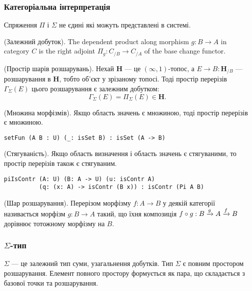 \subsubsection*{Категоріальна інтерпретація}
Спряження $\Pi$ і $\Sigma$ не єдині які можуть представлені в системі.

\begin{definition} (Залежний добуток).
The dependent product along morphism $g: B \rightarrow A$ in category $C$ is the right
adjoint $\Pi_g : C_{/B} \rightarrow C_{/A}$ of the base change functor.
\end{definition}

\begin{definition} (Простір шарів розшарувань).
Нехай $\mathbf{H}$ --- це $(\infty,1)$-топос, а $E \rightarrow B : \mathbf{H}_{/B}$ ---  розшарування в
$\mathbf{H}$, тобто об'єкт у зрізаному топосі.  Тоді простір перерізів $\Gamma_\Sigma(E)$
цього розшарування є залежним добутком:
$$ \Gamma_\Sigma(E) = \Pi_\Sigma (E) \in \mathbf{H}. $$
\end{definition}

\begin{theorem} (Множина морфізмів).
Якщо область значень є множиною, тоді простір перерізів є множиною.
\begin{lstlisting}
setFun (A B : U) (_: isSet B) : isSet (A -> B)
\end{lstlisting}
\end{theorem}

\begin{theorem} (Стягуваність).
Якщо область визначення і область значень є стягуваними, то простір перерізів також є стягуваним.
\begin{lstlisting}
piIsContr (A: U) (B: A -> U) (u: isContr A)
          (q: (x: A) -> isContr (B x)) : isContr (Pi A B)
\end{lstlisting}
\end{theorem}

\begin{definition} (Шар розшарування).
Перерізом морфізму $f: A \rightarrow B$ у деякій категорії називається морфізм $g: B \rightarrow A$
такий, що їхня композиція $f \circ g: B \xrightarrow{{g}} A \xrightarrow{{f}} B$ дорівнює тотожному морфізму на $B$.
\end{definition}

\newpage
\subsubsection{$\Sigma$-тип}
$\Sigma$ --- це залежний тип суми, узагальнення добутків.
Тип $\Sigma$ є повним простором розшарування.
Елемент повного простору формується як пара, що складається з базової точки та розшарування.



